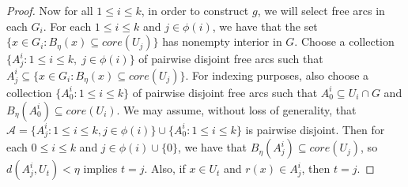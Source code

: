 \documentclass{amsart}
\numberwithin{equation}{section}
\begin{document}
\begin{proof}
%
%

Now for all $1\leq i \leq k$, in order to construct $g$, we will select free arcs in each $G_i$. For each $1\leq i \leq k$ and $j\in \phi(i)$, we have that the set $\{x\in G_i: B_\eta(x)\subseteq core(U_j)\}$ has nonempty interior in $G$. Choose a collection $\{A^i_j: 1\leq i\leq k,\; j\in \phi(i)\}$ of pairwise disjoint free arcs such that $A_j^i\subseteq \{x\in G_i: B_\eta(x)\subseteq core(U_j)\} $. For indexing purposes, also choose a collection $\{A_0^i: 1\leq i\leq k \}$ of pairwise disjoint free arcs such that $A^i_0\subseteq U_i\cap G$ and $B_\eta(A_0^i)\subseteq core(U_i)$. We may assume, without loss of generality, that $\mathcal A =\{A^i_j: 1\leq i\leq k, j\in \phi(i)\}\cup  \{A_0^i: 1\leq i\leq k \}$  is pairwise disjoint. Then for each $0\leq i\leq k$ and $j\in \phi(i)\cup \{0\}$, we have that $B_\eta(A_j^i)\subseteq core(U_j)$, so $d(A_j^i,U_t)<\eta$ implies $t=j$. Also, if $x\in U_t$ and $r(x)\in A_j^i$, then $t=j.$


\end{proof}
\end{document}
